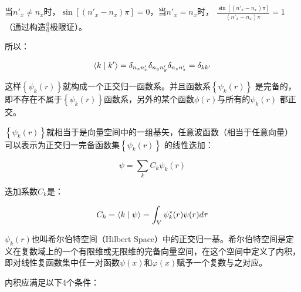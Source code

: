 当$n'_x  \ne n_x $时，$\sin \left[ {\left( {n'_x  - n_x } \right)\pi } \right] = 0$，当$n'_x  = n_x $时，
$\frac{{\sin \left[ {\left( {n'_x  - n_x } \right)\pi } \right]}}{{\left( {n'_x  - n_x } \right)\pi }} = 1$（通过构造$\frac{0}{0}$极限证）。

所以：

\begin{equation}
\left\langle {k}
 \mathrel{\left | {\vphantom {k {k'}}}
 \right. \kern-\nulldelimiterspace}
 {{k'}} \right\rangle  = \delta _{n_x n'_x } \delta _{n_y n'_y } \delta _{n_z n'_z }  = \delta _{kk'} 
\end{equation}

这样$\left\{ {\psi _k (r)} \right\}$就构成一个正交归一函数系。并且函数系$\left\{ {\psi _k (r)} \right\}$
是完备的，即不存在不属于$\left\{ {\psi _k (r)} \right\}$函数系，另外的某个函数$\phi (r) $与所有的$\psi _k (r)$
都正交。

$\left\{ {\psi _k (r)} \right\}$就相当于是向量空间中的一组基矢，任意波函数（相当于任意向量）可以表示为正交归一完备函数集$\left\{ {\psi
_k (r)} \right\}$ 的线性迭加：


\begin{equation}
\psi  = \sum\limits_k {C_k \psi _k (r)}
\end{equation}

迭加系数$C_k$是：

\begin{equation}
C_k  = \left\langle {k}
 \mathrel{\left | {\vphantom {k \psi }}
 \right. \kern-\nulldelimiterspace}
 {\psi } \right\rangle  = \int_V {\psi _k ^* (r)\psi (r)d\tau } 
\end{equation}



$\psi _k (r)$也叫希尔伯特空间（Hilbert Space）中的正交归一基。希尔伯特空间是定义在复数域上的一个有限维或无限维的完备向量空间，在这个空间中定义了内积，即对线性复函数集中任一对函数$\psi (x)$和$\varphi (x)$赋予一个复数与之对应。

内积应满足以下4个条件：


